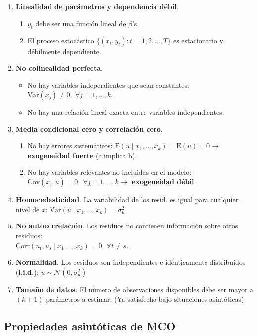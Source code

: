 \documentclass[10pt, a4paper, landscape]{extarticle}
\newcommand{\E}{\mathrm{E}}
\newcommand{\Var}{\mathrm{Var}}
\newcommand{\Cov}{\mathrm{Cov}}
\newcommand{\Corr}{\mathrm{Corr}}
\begin{document}
\begin{multicols}{3}
\begin{enumerate}[leftmargin=*, label=t\arabic*.]
	\item \textbf{Linealidad de parámetros y dependencia débil}.
	\begin{enumerate}[leftmargin=*, label=\alph*.]
		\item $y_t$ debe ser una función lineal de $\beta$'s.
		\item El proceso estocástico $\lbrace(x_t, y_t) : t = 1, 2, \ldots, T\rbrace$ es estacionario y débilmente dependiente.
	\end{enumerate}
	\item \textbf{No colinealidad perfecta}.
	\begin{itemize}[leftmargin=*]
		\item No hay variables independientes que sean constantes: $\Var(x_j) \neq 0, \; \forall j = 1, \ldots, k$.
		\item No hay una relación lineal exacta entre variables independientes.
	\end{itemize}
	\item \textbf{Media condicional cero y correlación cero}.
	\begin{enumerate}[leftmargin=*, label=\alph*.]
		\item No hay errores sistemáticos: $\E(u \mid x_1, \ldots, x_k) = \E(u) = 0 \rightarrow$ \textbf{exogeneidad fuerte} (a implica b).
		\item No hay variables relevantes no incluidas en el modelo: $\Cov(x_j , u) = 0, \; \forall j = 1, \ldots, k \rightarrow$ \textbf{exogeneidad débil}.
	\end{enumerate}
	\item \textbf{Homocedasticidad}. La variabilidad de los resid. es igual para cualquier nivel de $x$: $\Var(u \mid x_1, \ldots, x_k) = \sigma^2_u$
	\item \textbf{No autocorrelación}. Los residuos no contienen información sobre otros residuos: \\ $\Corr(u_t, u_s \mid x_1, \ldots, x_k) = 0, \; \forall t \neq s$.
	\item \textbf{Normalidad}. Los residuos son independientes e idénticamente distribuidos (\textbf{i.i.d.}): $u \sim \mathcal{N}(0, \sigma^2_u)$
			\item \textbf{Tamaño de datos}. El número de observaciones disponibles debe ser mayor a $(k + 1)$ parámetros a estimar. (Ya satisfecho bajo situaciones asintóticas)
\end{enumerate}

\subsection*{Propiedades asintóticas de MCO}


\end{multicols}
\end{document}
